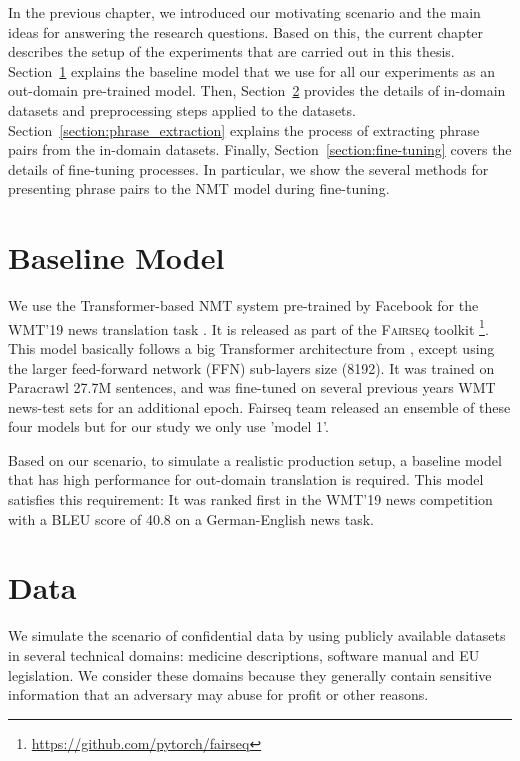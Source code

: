 In the previous chapter, we introduced our motivating scenario and the main ideas for answering the research questions. 
Based on this, the current chapter describes the setup of the experiments that are carried out in this thesis. %
Section~\ref{section:baseline} explains the baseline model that we use for all our experiments as an out-domain pre-trained model. Then, Section~\ref{section:datasets} provides the details of in-domain datasets and preprocessing steps applied to the datasets. Section~\ref{section:phrase_extraction} explains the process of extracting phrase pairs from the in-domain datasets. Finally, Section~\ref{section:fine-tuning} covers the details of fine-tuning processes. In particular, we show the several methods for presenting phrase pairs to the NMT model during fine-tuning.


\section{Baseline Model}\label{section:baseline}

We use the Transformer-based NMT system \parencite{vaswani2017attention} pre-trained by Facebook for the WMT'19 news translation task \parencite{ng-etal-2019-facebook}. It is released as part of the \textsc{Fairseq} toolkit \parencite{ott-etal-2019-fairseq}\footnote{\url{https://github.com/pytorch/fairseq}}. This model basically follows a big Transformer architecture from \cite{vaswani2017attention}, except using the larger feed-forward network (FFN) sub-layers size (8192). It was trained on Paracrawl 27.7M sentences, and was fine-tuned on several previous years WMT news-test sets for an additional epoch. Fairseq team released an ensemble of these four models but for our study we only use 'model 1'. 

Based on our scenario, to simulate a realistic production setup, a baseline model that has high performance for out-domain translation is required. This model satisfies this requirement: It was ranked first in the WMT'19 news competition \parencite{barrault-etal-2019-findings} with a BLEU score of 40.8 on a German-English news task. 


\section{Data}\label{section:datasets}
We simulate the scenario of confidential data by using publicly available datasets in several technical domains: medicine descriptions, software manual and EU legislation. We consider these domains because they generally contain sensitive information that an adversary may abuse for profit or other reasons. 

